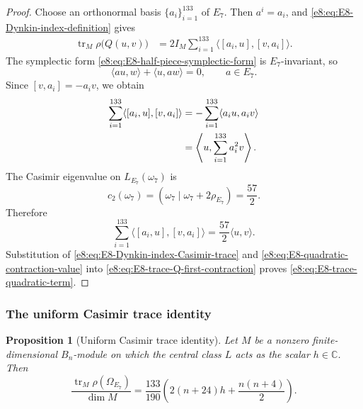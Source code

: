 \documentclass[11pt,reqno]{amsart}
\newtheorem{proposition}[theorem]{Proposition}
\theoremstyle{definition}
\theoremstyle{remark}
\providecommand{\C}{\mathbb{C}}
\providecommand{\tr}{\operatorname{tr}}
\begin{document}
\begin{proof}
Choose an orthonormal basis $\{a_i\}_{i=1}^{133}$ of $E_7$.  Then
$a^i=a_i$, and \eqref{e8:eq:E8-Dynkin-index-definition} gives
\begin{align}
  \tr_M\rho\bigl(Q(u,v)\bigr)
  &=2I_M\sum_{i=1}^{133}
    \langle[a_i,u],[v,a_i]\rangle.
  \label{e8:eq:E8-trace-Q-first-contraction}
\end{align}
The symplectic form \eqref{e8:eq:E8-half-piece-symplectic-form} is
$E_7$-invariant, so
\begin{equation*}
  \langle au,w\rangle+\langle u,aw\rangle=0,
  \qquad a\in E_7.
\end{equation*}
Since $[v,a_i]=-a_iv$, we obtain
\begin{align*}
  \sum_{i=1}^{133}\langle[a_i,u],[v,a_i]\rangle
  &=-\sum_{i=1}^{133}\langle a_iu,a_iv\rangle
   \notag\\
  &=\left\langle u,\sum_{i=1}^{133}a_i^2v\right\rangle.
\end{align*}
The Casimir eigenvalue on $L_{E_7}(\omega_7)$ is
\begin{equation*}
  c_2(\omega_7)
  =(\omega_7\mid\omega_7+2\rho_{E_7})
  =\frac{57}{2}.
\end{equation*}
Therefore
\begin{equation}
  \sum_{i=1}^{133}\langle[a_i,u],[v,a_i]\rangle
  =\frac{57}{2}\langle u,v\rangle.
  \label{e8:eq:E8-quadratic-contraction-value}
\end{equation}
Substitution of
\eqref{e8:eq:E8-Dynkin-index-Casimir-trace} and
\eqref{e8:eq:E8-quadratic-contraction-value} into
\eqref{e8:eq:E8-trace-Q-first-contraction} proves
\eqref{e8:eq:E8-trace-quadratic-term}.
\end{proof}

\subsubsection{The uniform Casimir trace identity}


\begin{proposition}[Uniform Casimir trace identity]
\label{e8:prop:E8-uniform-Casimir-trace-identity}
Let $M$ be a nonzero finite-dimensional $B_n$-module on which the central
class $L$ acts as the scalar $h\in\C$.  Then
\begin{equation}
  \frac{\tr_M\rho(\Omega_{E_7})}{\dim M}
  =\frac{133}{190}
   \left(
     2(n+24)h+\frac{n(n+4)}2
   \right).
  \label{e8:eq:E8-uniform-Casimir-trace-identity}
\end{equation}
\end{proposition}
\end{document}
